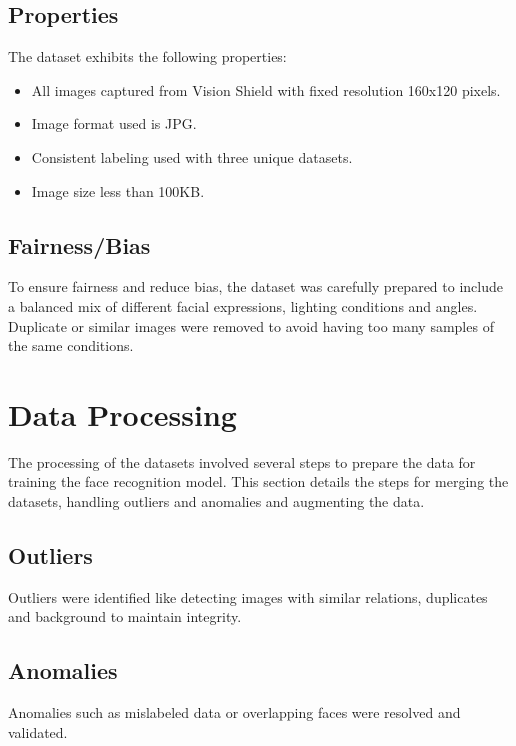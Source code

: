 \subsection{Properties}
The dataset exhibits the following properties:
\begin{itemize}
	\item All images captured from Vision Shield with fixed resolution 160x120 pixels.
	\item Image format used is JPG.
	\item Consistent labeling used with three unique datasets.
	\item Image size less than 100KB.
\end{itemize}

\subsection{Fairness/Bias}
To ensure fairness and reduce bias, the dataset was carefully prepared to include a balanced mix of different facial expressions, lighting conditions and angles. Duplicate or similar images were removed to avoid having too many samples of the same conditions.

\section{Data Processing}
The processing of the datasets involved several steps to prepare the data for training the face recognition model. This section details the steps for merging the datasets, handling outliers and anomalies and augmenting the data. \cite{KDD:2000}

\subsection{Outliers}
Outliers were identified like detecting images with similar relations, duplicates and background to maintain integrity.

\subsection{Anomalies}
Anomalies such as mislabeled data or overlapping faces were resolved and validated.

